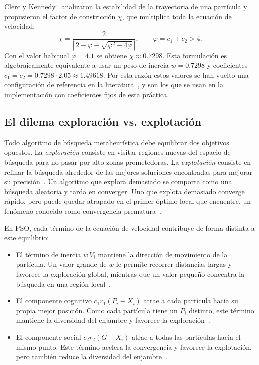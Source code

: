 Clerc y Kennedy~\cite{clerc2002particle} analizaron la estabilidad de la trayectoria de una partícula y propusieron el factor de constricción $\chi$, que multiplica toda la ecuación de velocidad:
\begin{equation}
    \chi = \frac{2}{\left|\, 2 - \varphi - \sqrt{\varphi^2 - 4\varphi} \,\right|}, \qquad \varphi = c_1 + c_2 > 4.
    \label{eq:constriccion}
\end{equation}
Con el valor habitual $\varphi = 4.1$ se obtiene $\chi \approx 0.7298$. Esta formulación es algebraicamente equivalente a usar un peso de inercia $w = 0.7298$ y coeficientes $c_1 = c_2 = 0.7298 \cdot 2.05 \approx 1.49618$. Por esta razón estos valores se han vuelto una configuración de referencia en la literatura~\cite{eberhart2000comparing, poli2007overview}, y son los que se usan en la implementación con coeficientes fijos de esta práctica.

\subsection{El dilema exploración vs. explotación}
\label{sec:exploracion}

Todo algoritmo de búsqueda metaheurística debe equilibrar dos objetivos opuestos. La \textit{exploración} consiste en visitar regiones nuevas del espacio de búsqueda para no pasar por alto zonas prometedoras. La \textit{explotación} consiste en refinar la búsqueda alrededor de las mejores soluciones encontradas para mejorar su precisión~\cite{crepinsek2013exploration}. Un algoritmo que explora demasiado se comporta como una búsqueda aleatoria y tarda en converger. Uno que explota demasiado converge rápido, pero puede quedar atrapado en el primer óptimo local que encuentre, un fenómeno conocido como convergencia prematura~\cite{crepinsek2013exploration, zhan2009adaptive}.

En PSO, cada término de la ecuación de velocidad contribuye de forma distinta a este equilibrio:
\begin{itemize}
    \item El término de inercia $w\,V_i$ mantiene la dirección de movimiento de la partícula. Un valor grande de $w$ le permite recorrer distancias largas y favorece la exploración global, mientras que un valor pequeño concentra la búsqueda en una región local~\cite{shi1998modified, shi1998parameter}.
    \item El componente cognitivo $c_1 r_1 (P_i - X_i)$ atrae a cada partícula hacia su propia mejor posición. Como cada partícula tiene un $P_i$ distinto, este término mantiene la diversidad del enjambre y favorece la exploración~\cite{ratnaweera2004self}.
    \item El componente social $c_2 r_2 (G - X_i)$ atrae a todas las partículas hacia el mismo punto. Este término acelera la convergencia y favorece la explotación, pero también reduce la diversidad del enjambre~\cite{ratnaweera2004self}.
\end{itemize}

